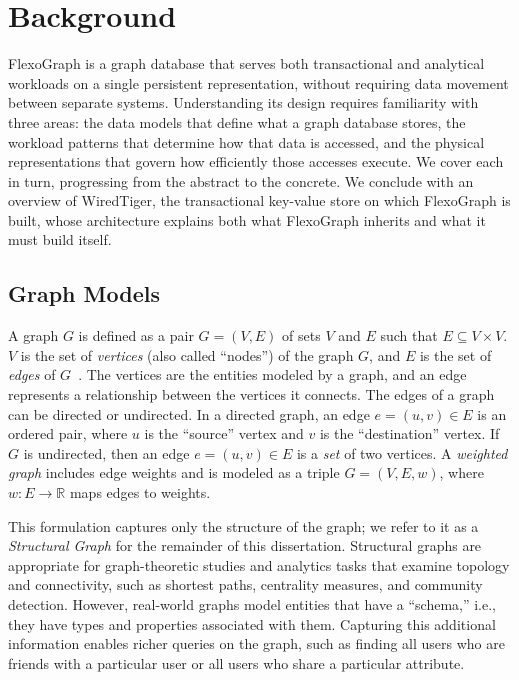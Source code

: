 \chapter{Background}
\label{sec:bg}
FlexoGraph is a graph database that serves both transactional and analytical workloads on a single persistent representation, without requiring data movement between separate systems.
Understanding its design requires familiarity with three areas: the data models that define what a graph database stores, the workload patterns that determine how that data is accessed, and the physical representations that govern how efficiently those accesses execute.
We cover each in turn, progressing from the abstract to the concrete.
We conclude with an overview of WiredTiger, the transactional key-value store on which FlexoGraph is built, whose architecture explains both what FlexoGraph inherits and what it must build itself.

\section{Graph Models}
\label{sec:bg:model}

A graph $G$ is defined as a pair $G = (V, E)$ of sets $V$ and $E$ such that $E \subseteq V \times V$. $V$ is the set of \textit{vertices} (also called ``nodes'') of the graph $G$, and $E$ is the set of \textit{edges} of $G$~\cite{diestel2017basics}.
The vertices are the entities modeled by a graph, and an edge represents a relationship between the vertices it connects.
The edges of a graph can be directed or undirected.
In a directed graph, an edge $e = (u, v) \in E$ is an ordered pair, where $u$ is the ``source'' vertex and $v$ is the ``destination'' vertex.
If $G$ is undirected, then an edge $e = (u, v) \in E$ is a \emph{set} of two vertices.
A \emph{weighted graph} includes edge weights and is modeled as a triple $G = (V, E, w)$, where $w: E \rightarrow \mathbb{R}$ maps edges to weights.

This formulation captures only the structure of the graph; we refer to it as a \emph{Structural Graph} for the remainder of this dissertation.
Structural graphs are appropriate for graph-theoretic studies and analytics tasks that examine topology and connectivity, such as shortest paths, centrality measures, and community detection.
However, real-world graphs model entities that have a ``schema,'' i.e., they have types and properties associated with them.
Capturing this additional information enables richer queries on the graph, such as finding all users who are friends with a particular user or all users who share a particular attribute.

